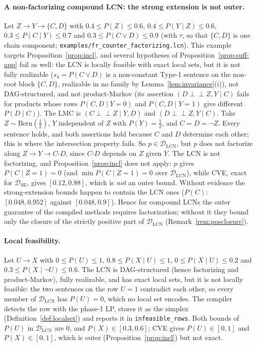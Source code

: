 \documentclass{article} %
\newcommand{\indep}{\perp\!\!\!\perp}
\newcommand{\DSE}{\mathcal{D}_{\mathrm{SE}}}
\newcommand{\DLCN}{\mathcal{D}_{\mathrm{LCN}}}
\begin{document}
\paragraph{A non-factorizing compound LCN: the strong extension is not outer.}
Let $Z\to Y\to\{C,D\}$ with $0.4\le P(Z)\le0.6$, $0.4\le P(Y\mid Z)\le0.6$,
$0.3\le P(C\mid Y)\le0.7$ and $0.3\le P(C\vee D)\le0.9$ (with $\tau$, so that $\{C,D\}$
is one chain component; \texttt{examples/fr\_counter\_factorizing.lcn}). This example targets
Proposition~\ref{prop:incl}, and several hypotheses of Proposition~\ref{prop:suff-app} fail as well:
the LCN is locally feasible with exact local sets, but it is not fully realizable ($s_4=P(C\vee D)$ is
a non-constant Type-1 sentence on the non-root block $\{C,D\}$, realizable in no family by
Lemma~\ref{lem:invariance}(i)), not DAG-structured, and not product-Markov (its assertion
$(D\indep Z,Y\mid C)$ fails for products whose rows $P(C,D\mid Y{=}0)$ and $P(C,D\mid Y{=}1)$ give
different $P(D\mid C)$). The LMC is $(C\indep Z\mid Y,D)$ and $(D\indep Z,Y\mid C)$. Take
$Z\sim\mathrm{Bern}(\tfrac12)$, $Y$ independent of $Z$ with $P(Y)=\tfrac12$, and $C=D=\lnot Z$. Every
sentence holds, and both assertions hold because $C$ and $D$ determine each other; this is where the
intersection property fails. So $p\in\DLCN$, but $p$ does not factorize along
$Z\to Y\to C\text{-}D$, since $C\text{-}D$ depends on $Z$ given $Y$. The LCN is not factorizing, and
Proposition~\ref{prop:incl} does not apply: $p$ gives $P(C\mid Z{=}1)=0$ (and $\min P(C\mid Z{=}1)=0$
over $\DLCN$), while CVE, exact for $\DSE$, gives $[0.12,0.88]$, which is \emph{not} an outer bound.
Without evidence the strong-extension bounds happen to contain the LCN ones ($P(C)$: $[0.048,0.952]$
against $[0.048,0.9]$). Hence for compound LCNs the outer guarantee of the compiled methods requires
factorization; without it they bound only the closure of the strictly positive part of $\DLCN$
(Remark~\ref{rem:posclosure}).

\paragraph{Local feasibility.}
Let $U\to X$ with $0\le P(U)\le1$, $0.8\le P(X\mid U)\le1$, $0\le P(X\mid U)\le0.2$ and
$0.3\le P(X\mid\lnot U)\le0.6$. The LCN is DAG-structured (hence factorizing and product-Markov),
fully realizable, and has exact local sets, but it is not locally feasible: the two sentences on the
row $U{=}1$ contradict each other, so every member of $\DLCN$ has $P(U)=0$, which no local set
encodes. The compiler detects the row with the phase-1 LP, stores it as the simplex
(Definition~\ref{def:localset}) and reports it in \texttt{infeasible\_rows}. Both bounds of $P(U)$ in
$\DLCN$ are $0$, and $P(X)\in[0.3,0.6]$; CVE gives $P(U)\in[0,1]$ and $P(X)\in[0,1]$, which is outer
(Proposition~\ref{prop:incl}) but not exact.
\end{document}
